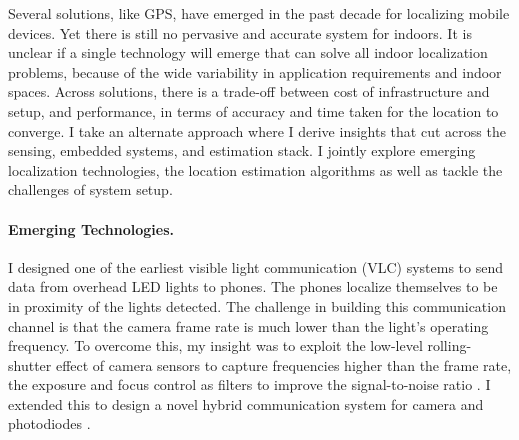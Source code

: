 \documentclass[10pt]{article}
\begin{document}
Several solutions, like GPS, have emerged in the past decade for localizing mobile devices. Yet there is still no pervasive and accurate system for indoors.  
It is unclear if a single technology will emerge that can solve all
indoor localization problems, because of the wide variability in
application requirements and indoor spaces.  Across solutions, there
is a trade-off between cost of infrastructure and setup, and
performance, in terms of accuracy and time taken for the location to
converge. I take an alternate approach where I derive insights that
cut across the sensing, embedded systems, and estimation stack. I
jointly explore emerging localization technologies, the location
estimation algorithms as well as tackle the challenges of system
setup.


\paragraph{Emerging Technologies. }

I designed one of the earliest visible light communication (VLC)
systems to send data from overhead LED lights to phones. The phones
localize themselves to be in proximity of the lights detected. The
challenge in building this communication channel is that the camera
frame rate is much lower than the light's operating frequency.  To
overcome this, my insight was to exploit the low-level rolling-shutter
effect of camera sensors to capture frequencies higher than the frame
rate, the exposure and focus control as filters to improve the
signal-to-noise ratio \cite{rajagopal2014visual,
  rajagopal2014demonstration}. I extended this to design a novel
hybrid communication system for camera and photodiodes
\cite{rajagopal2014hybrid}.
\end{document}
